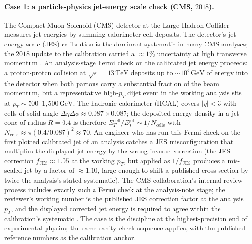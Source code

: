 \paragraph{Case 1: a particle-physics jet-energy scale check
(CMS, $2018$).} The Compact Muon Solenoid (CMS) detector at the
Large Hadron Collider measures jet energies by summing
calorimeter cell deposits. The detector's jet-energy scale (JES)
calibration is the dominant systematic in many CMS analyses; the
$2018$ update to the calibration carried a $\approx 1\%$
uncertainty at high transverse momentum
\cite{paper:ch09t3b-cms-jes-2017}. An analysis-stage Fermi check
on the calibrated jet energy proceeds: a proton-proton collision
at $\sqrt{s} = 13 \,\si{\tera\electronvolt}$ deposits up to
$\sim 10^{4} \,\si{\giga\electronvolt}$ of energy into the
detector when both partons carry a substantial fraction of the
beam momentum, but a representative high-$p_{T}$ dijet event in
the working analysis sits at $p_{T} \sim 500$--$1{,}500 \,
\si{\giga\electronvolt}$. The hadronic calorimeter (HCAL) covers
$|\eta| < 3$ with cells of solid angle $\Delta \eta \Delta \phi
\approx 0.087 \times 0.087$; the deposited energy density in a
jet cone of radius $R = 0.4$ is therefore
$E_{T}^{\text{cell}} / E_{T}^{\text{jet}} \sim 1/N_{\text{cells}}$
with $N_{\text{cells}} \approx \pi (0.4/0.087)^{2} \approx 70$.
An engineer who has run this Fermi check on the first plotted
calibrated jet of an analysis catches a JES misconfiguration that
multiplies the displayed jet energy by the wrong inverse
correction (the JES correction $f_{\text{JES}} \approx 1.05$ at
the working $p_{T}$, but applied as $1/f_{\text{JES}}$ produces a
mis-scaled jet by a factor of $\approx 1.10$, large enough to
shift a published cross-section by twice the analysis's stated
systematic). The CMS collaboration's internal review process
includes exactly such a Fermi check at the analysis-note stage;
the reviewer's working number is the published JES correction
factor at the analysis $p_{T}$, and the displayed corrected jet
energy is required to agree within the calibration's systematic
\cite{paper:ch09t3b-cms-jes-2017}. The case is the discipline at
the highest-precision end of experimental physics; the same
sanity-check sequence applies, with the published reference
numbers as the calibration anchor.

